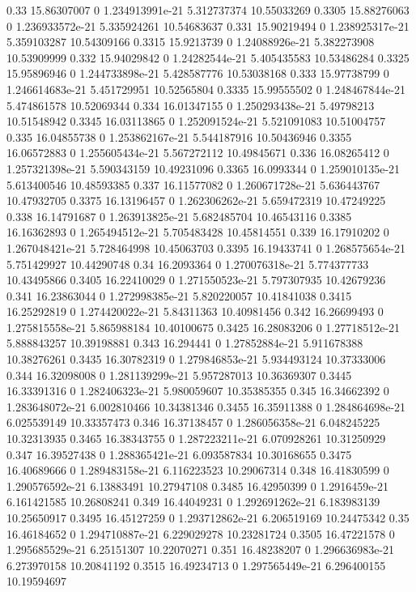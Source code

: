 {0.33 15.86307007 0 1.234913991e-21 5.312737374 10.55033269
0.3305 15.88276063 0 1.236933572e-21 5.335924261 10.54683637
0.331 15.90219494 0 1.238925317e-21 5.359103287 10.54309166
0.3315 15.9213739 0 1.24088926e-21 5.382273908 10.53909999
0.332 15.94029842 0 1.24282544e-21 5.405435583 10.53486284
0.3325 15.95896946 0 1.244733898e-21 5.428587776 10.53038168
0.333 15.97738799 0 1.246614683e-21 5.451729951 10.52565804
0.3335 15.99555502 0 1.248467844e-21 5.474861578 10.52069344
0.334 16.01347155 0 1.250293438e-21 5.49798213 10.51548942
0.3345 16.03113865 0 1.252091524e-21 5.521091083 10.51004757
0.335 16.04855738 0 1.253862167e-21 5.544187916 10.50436946
0.3355 16.06572883 0 1.255605434e-21 5.567272112 10.49845671
0.336 16.08265412 0 1.257321398e-21 5.590343159 10.49231096
0.3365 16.0993344 0 1.259010135e-21 5.613400546 10.48593385
0.337 16.11577082 0 1.260671728e-21 5.636443767 10.47932705
0.3375 16.13196457 0 1.262306262e-21 5.659472319 10.47249225
0.338 16.14791687 0 1.263913825e-21 5.682485704 10.46543116
0.3385 16.16362893 0 1.265494512e-21 5.705483428 10.45814551
0.339 16.17910202 0 1.267048421e-21 5.728464998 10.45063703
0.3395 16.19433741 0 1.268575654e-21 5.751429927 10.44290748
0.34 16.2093364 0 1.270076318e-21 5.774377733 10.43495866
0.3405 16.22410029 0 1.271550523e-21 5.797307935 10.42679236
0.341 16.23863044 0 1.272998385e-21 5.820220057 10.41841038
0.3415 16.25292819 0 1.274420022e-21 5.84311363 10.40981456
0.342 16.26699493 0 1.275815558e-21 5.865988184 10.40100675
0.3425 16.28083206 0 1.27718512e-21 5.888843257 10.39198881
0.343 16.294441 0 1.27852884e-21 5.911678388 10.38276261
0.3435 16.30782319 0 1.279846853e-21 5.934493124 10.37333006
0.344 16.32098008 0 1.281139299e-21 5.957287013 10.36369307
0.3445 16.33391316 0 1.282406323e-21 5.980059607 10.35385355
0.345 16.34662392 0 1.283648072e-21 6.002810466 10.34381346
0.3455 16.35911388 0 1.284864698e-21 6.025539149 10.33357473
0.346 16.37138457 0 1.286056358e-21 6.048245225 10.32313935
0.3465 16.38343755 0 1.287223211e-21 6.070928261 10.31250929
0.347 16.39527438 0 1.288365421e-21 6.093587834 10.30168655
0.3475 16.40689666 0 1.289483158e-21 6.116223523 10.29067314
0.348 16.41830599 0 1.290576592e-21 6.13883491 10.27947108
0.3485 16.42950399 0 1.2916459e-21 6.161421585 10.26808241
0.349 16.44049231 0 1.292691262e-21 6.183983139 10.25650917
0.3495 16.45127259 0 1.293712862e-21 6.206519169 10.24475342
0.35 16.46184652 0 1.294710887e-21 6.229029278 10.23281724
0.3505 16.47221578 0 1.295685529e-21 6.25151307 10.22070271
0.351 16.48238207 0 1.296636983e-21 6.273970158 10.20841192
0.3515 16.49234713 0 1.297565449e-21 6.296400155 10.19594697
}
